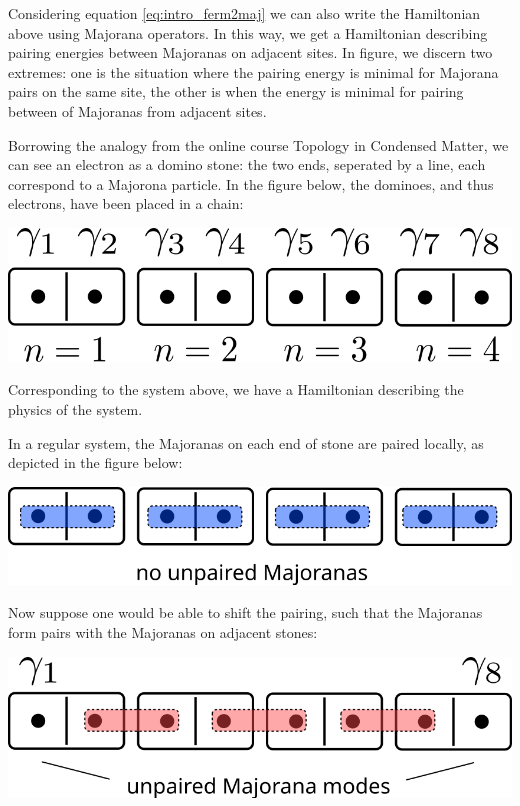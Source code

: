	Considering equation \eqref{eq:intro_ferm2maj} we can also write the Hamiltonian above using Majorana operators.
	In this way, we get a Hamiltonian describing pairing energies between Majoranas on adjacent sites.
	In figure, we discern two extremes:
	one is the situation where the pairing energy is minimal for Majorana pairs on the same site, the other is when the energy is minimal for pairing between of Majoranas from adjacent sites. 


	Borrowing the analogy from the online course Topology in Condensed Matter\cite{noauthor_topology_2015}, we can see an electron as a domino stone: the two ends, seperated by a line, each correspond to a Majorona particle.
	In the figure below\cite{noauthor_topology_2015}, the dominoes, and thus electrons, have been placed in a chain:\\
	
	\begin{centering}
	\includegraphics[width=0.95\columnwidth]{images/majorana_dominoes}
	\end{centering}
	
	Corresponding to the system above, we have a Hamiltonian describing the physics of the system.

	In a regular system, the Majoranas on each end of stone are paired locally, as depicted in the figure below:\\

	\begin{centering}
	\includegraphics[width=0.95\columnwidth]{images/trivial_dominoes}
	\end{centering}
	
	Now suppose one would be able to shift the pairing, such that the Majoranas form pairs with the Majoranas on adjacent stones:\\

	\begin{centering}
	\includegraphics[width=0.95\columnwidth]{images/topological_dominoes}
	\end{centering}
	
